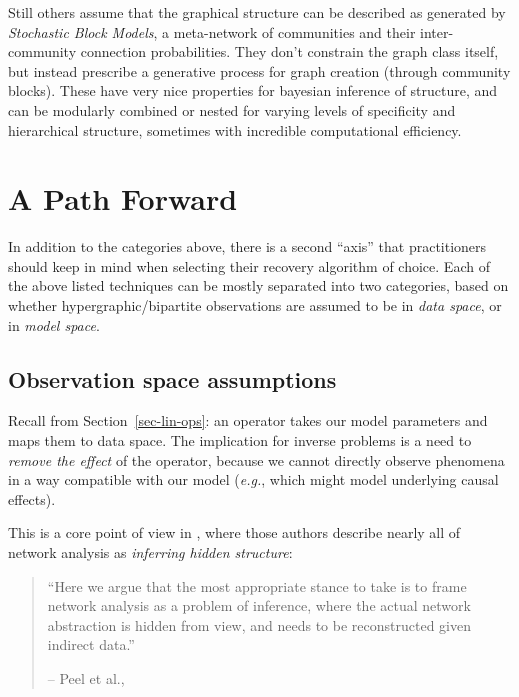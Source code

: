 \documentclass[%
	12pt,
		oneside,
		letterpaper
]{book}
\begin{document}
Still others assume that the graphical structure can be described as
generated by \emph{Stochastic Block Models}, a meta-network of
communities and their inter-community connection probabilities. They
don't constrain the graph class itself, but instead prescribe a
generative process for graph creation (through community blocks). These
have very nice properties for bayesian inference of structure, and can
be modularly combined or nested for varying levels of specificity and
hierarchical structure, sometimes with incredible computational
efficiency.
\autocite{ReconstructingNetworksUnknown_Peixoto2018,NetworkReconstructionCommunity_Peixoto2019}

\section{A Path Forward}\label{a-path-forward}

In addition to the categories above, there is a second ``axis'' that
practitioners should keep in mind when selecting their recovery
algorithm of choice. Each of the above listed techniques can be mostly
separated into two categories, based on whether hypergraphic/bipartite
observations are assumed to be in \emph{data space}, or in \emph{model
space}.

\subsection{Observation space
assumptions}\label{observation-space-assumptions}

Recall from Section~\ref{sec-lin-ops}: an operator takes our model
parameters and maps them to data space. The implication for inverse
problems is a need to \emph{remove the effect} of the operator, because
we cannot directly observe phenomena in a way compatible with our model
(\emph{e.g.}, which might model underlying causal effects).

This is a core point of view in
\textcite{Statisticalinferencelinks_Peel2022}, where those authors
describe nearly all of network analysis as \emph{inferring hidden
structure}:

\singlespacing

\begin{quote}
``Here we argue that the most appropriate stance to take is to frame
network analysis as a problem of inference, where the actual network
abstraction is hidden from view, and needs to be reconstructed given
indirect data.''

\hfill -- Peel et al., \autocite{Statisticalinferencelinks_Peel2022}
\end{quote}
\end{document}
